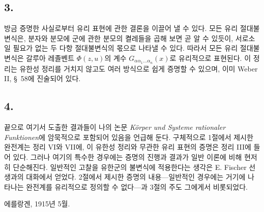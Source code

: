 \subsection*{3.}
방금 증명한 사실로부터 유리 표현에 관한 결론을 이끌어 낼 수 있다. 모든 유리 절대불변식은, 분자와 분모에 군에 관한 분모의 켤레들을 곱해 보면 곧 알 수 있듯이, 서로소일 필요가 없는 두 다항 절대불변식의 몫으로 나타낼 수 있다. 따라서 모든 유리 절대불변식은 갈루아 레졸벤트 $\Phi(z,u)$의 계수 $G_{\alpha\alpha_1\ldots\alpha_n}(x)$로 유리적으로 표현된다. 이 정리는 유한성 정리를 거치지 않고도 여러 방식으로 쉽게 증명할 수 있으며, 이미 Weber II, \S\ 58에 진술되어 있다.

\subsection*{4.}
끝으로 여기서 도출한 결과들이 나의 논문 \emph{Körper und Systeme rationaler Funktionen}에 암묵적으로 포함되어 있음을 언급해 둔다. 구체적으로 1절에서 제시한 완전계는 정리 VI와 VII에, 이 유한성 정리와 무관한 유리 표현의 증명은 정리 III에 들어 있다. 그러나 여기의 특수한 경우에는 증명의 진행과 결과가 일반 이론에 비해 현저히 단순해진다. 일반적인 고찰을 유한군의 불변식에 적용한다는 생각은 E. Fischer 선생과의 대화에서 얻었다. 2절에서 제시한 증명의 내용---일반적인 경우에는 거기에 나타나는 완전계를 유리적으로 정의할 수 없다---과 3절의 주도 그에게서 비롯되었다.

에를랑겐, 1915년 5월.
